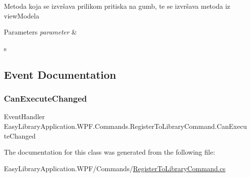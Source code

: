 Metoda koja se izvršava prilikom pritiska na gumb, te se izvršava metoda iz view\+Modela 


\begin{DoxyParams}{Parameters}
{\em parameter} & \\
\hline
\end{DoxyParams}
s 

\subsection{Event Documentation}
\mbox{\label{class_easy_library_application_1_1_w_p_f_1_1_commands_1_1_register_to_library_command_a41346ef92909df69a7eda23d52301898}} 
\subsubsection{\texorpdfstring{Can\+Execute\+Changed}{CanExecuteChanged}}
{\footnotesize\ttfamily Event\+Handler Easy\+Library\+Application.\+W\+P\+F.\+Commands.\+Register\+To\+Library\+Command.\+Can\+Execute\+Changed}



The documentation for this class was generated from the following file\+:\begin{DoxyCompactItemize}
\item 
Easy\+Library\+Application.\+W\+P\+F/\+Commands/\mbox{\hyperlink{_register_to_library_command_8cs}{Register\+To\+Library\+Command.\+cs}}\end{DoxyCompactItemize}
